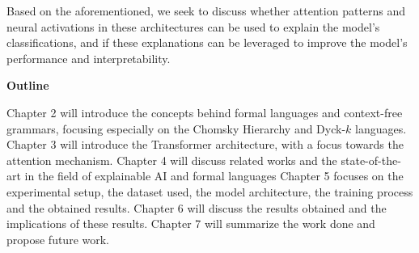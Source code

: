 Based on the aforementioned, we seek to discuss whether attention patterns and neural activations in these architectures can be used to explain the model's classifications, and if these explanations can be leveraged to improve the model's performance and interpretability.

\bigskip

\textbf{Outline}

Chapter 2 will introduce the concepts behind formal languages and context-free grammars, focusing especially on the Chomsky Hierarchy and Dyck-$k$ languages.
Chapter 3 will introduce the Transformer architecture, with a focus towards the attention mechanism.
Chapter 4 will discuss related works and the state-of-the-art in the field of explainable AI and formal languages
Chapter 5 focuses on the experimental setup, the dataset used, the model architecture, the training process and the obtained results.
Chapter 6 will discuss the results obtained and the implications of these results.
Chapter 7 will summarize the work done and propose future work.